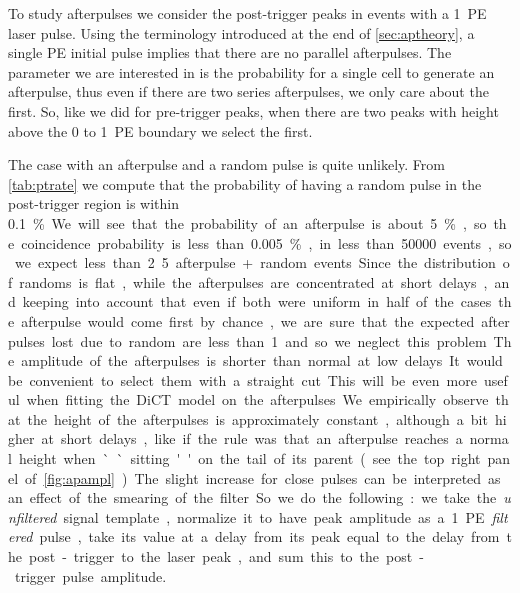 To study afterpulses we consider the post-trigger peaks in events with a 1~PE
laser pulse. Using the terminology introduced at the end of
\autoref{sec:aptheory}, a single PE initial pulse implies that there are no
parallel afterpulses. The parameter we are interested in is the probability for
a single cell to generate an afterpulse, thus even if there are two series
afterpulses, we only care about the first. So, like we did for pre-trigger
peaks, when there are two peaks with height above the 0 to 1~PE boundary we
select the first.

The case with an afterpulse and a random pulse is quite unlikely. From
\autoref{tab:ptrate} we compute that the probability of having a random pulse
in the post-trigger region is within \SI{0.1}\%. We will see that the
probability of an afterpulse is about \SI{5}\%, so the coincidence probability
is less than \SI{0.005}\%, in less than \num{50000} events, so we expect less
than 2.5 afterpulse+random events. Since the distribution of randoms is flat,
while the afterpulses are concentrated at short delays, and keeping into
account that even if both were uniform in half of the cases the afterpulse
would come first by chance, we are sure that the expected afterpulses lost due
to random are less than 1 and so we neglect this problem.

The amplitude of the afterpulses is shorter than normal at low delays. It would
be convenient to select them with a straight cut. This will be even more useful
when fitting the DiCT model on the afterpulses. We empirically observe that the
height of the afterpulses is approximately constant, although a bit higher at
short delays, like if the rule was that an afterpulse reaches a normal height
when ``sitting'' on the tail of its parent (see the top right panel of
\autoref{fig:apampl}). The slight increase for close pulses can be interpreted
as an effect of the smearing of the filter. So we do the following: we take the
\emph{unfiltered} signal template, normalize it to have peak amplitude as a
1~PE \emph{filtered} pulse, take its value at a delay from its peak equal to
the delay from the post-trigger to the laser peak, and sum this to the
post-trigger pulse amplitude.

\begin{figure}
    

    
    
\end{figure}

